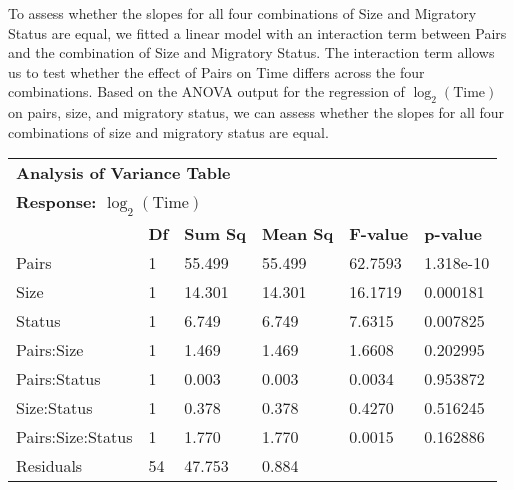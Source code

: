 \documentclass[a4paper, 12pt]{article}
\begin{document}
\begin{spacing}{1.5}
To assess whether the slopes for all four combinations of Size and Migratory Status are equal, we fitted a linear model with an interaction term between Pairs and the combination of Size and Migratory Status. The interaction term allows us to test whether the effect of Pairs on Time differs across the four combinations. Based on the ANOVA output for the regression of $\log_2(\text{Time})$ on pairs, size, and migratory status, we can assess whether the slopes for all four combinations of size and migratory status are equal.

\begin{table}[h]
\centering
\begin{tabular}{llllll}
\hline
\multicolumn{6}{l}{\textbf{Analysis of Variance Table}}                                                     \\
\multicolumn{6}{l}{\textbf{Response: $\log_2(\text{Time})$}}                                                \\ \hline
\textbf{}         & \textbf{Df} & \textbf{Sum Sq} & \textbf{Mean Sq} & \textbf{F-value} & \textbf{p-value} \\
Pairs             & 1           & 55.499          & 55.499           & 62.7593          & 1.318e-10         \\
Size              & 1           & 14.301          & 14.301           & 16.1719          & 0.000181          \\
Status            & 1           & 6.749           & 6.749            & 7.6315           & 0.007825          \\
Pairs:Size        & 1           & 1.469           & 1.469            & 1.6608           & 0.202995          \\
Pairs:Status      & 1           & 0.003           & 0.003            & 0.0034           & 0.953872          \\
Size:Status       & 1           & 0.378           & 0.378            & 0.4270           & 0.516245          \\
Pairs:Size:Status & 1           & 1.770           & 1.770            & 0.0015           & 0.162886          \\
Residuals         & 54          & 47.753          & 0.884            &                  &                   \\ \hline
\end{tabular}
\begin{center}
    \vspace{1mm}
\end{center}
\end{table}


\end{spacing}
\end{document}
